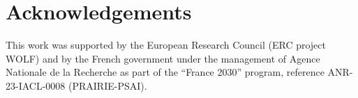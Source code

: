 \documentclass[10pt,a4paper,twoside,openany]{book}
\begin{document}
\section*{Acknowledgements}

This work was supported by the European Research Council (ERC project WOLF) and by the French government under the management of Agence Nationale de la Recherche as part of the ``France 2030'' program, reference ANR-23-IACL-0008 (PRAIRIE-PSAI).





\clearpage
\appendix


\cleardoublepage
{}
{}
\printindex
\end{document}
